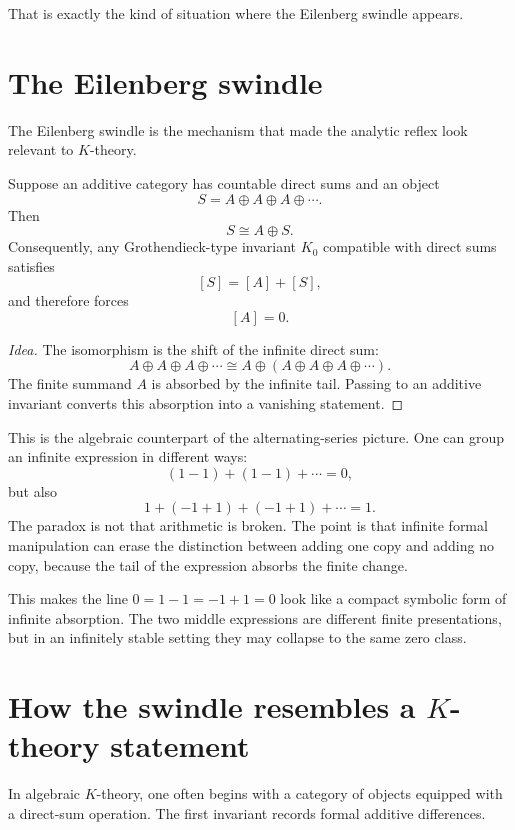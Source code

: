 That is exactly the kind of situation where the Eilenberg swindle appears.

\section{The Eilenberg swindle}

The Eilenberg swindle is the mechanism that made the analytic reflex look relevant to \(K\)-theory.

\begin{theorem}
Suppose an additive category has countable direct sums and an object
\[
  S=A\oplus A\oplus A\oplus\cdots.
\]
Then
\[
  S\cong A\oplus S.
\]
Consequently, any Grothendieck-type invariant \(K_0\) compatible with direct sums satisfies
\[
  [S]=[A]+[S],
\]
and therefore forces
\[
  [A]=0.
\]
\end{theorem}

\begin{proof}[Idea]
The isomorphism is the shift of the infinite direct sum:
\[
  A\oplus A\oplus A\oplus\cdots
  \cong
  A\oplus(A\oplus A\oplus A\oplus\cdots).
\]
The finite summand \(A\) is absorbed by the infinite tail.  Passing to an additive invariant converts this absorption into a vanishing statement.
\end{proof}

This is the algebraic counterpart of the alternating-series picture.  One can group an infinite expression in different ways:
\[
  (1-1)+(1-1)+\cdots=0,
\]
but also
\[
  1+(-1+1)+(-1+1)+\cdots=1.
\]
The paradox is not that arithmetic is broken.  The point is that infinite formal manipulation can erase the distinction between adding one copy and adding no copy, because the tail of the expression absorbs the finite change.

\begin{remark}
This makes the line \(0=1-1=-1+1=0\) look like a compact symbolic form of infinite absorption.  The two middle expressions are different finite presentations, but in an infinitely stable setting they may collapse to the same zero class.
\end{remark}

\section[How the swindle resembles a K-theory statement]{How the swindle resembles a \(K\)-theory statement}

In algebraic \(K\)-theory, one often begins with a category of objects equipped with a direct-sum operation.  The first invariant records formal additive differences.

